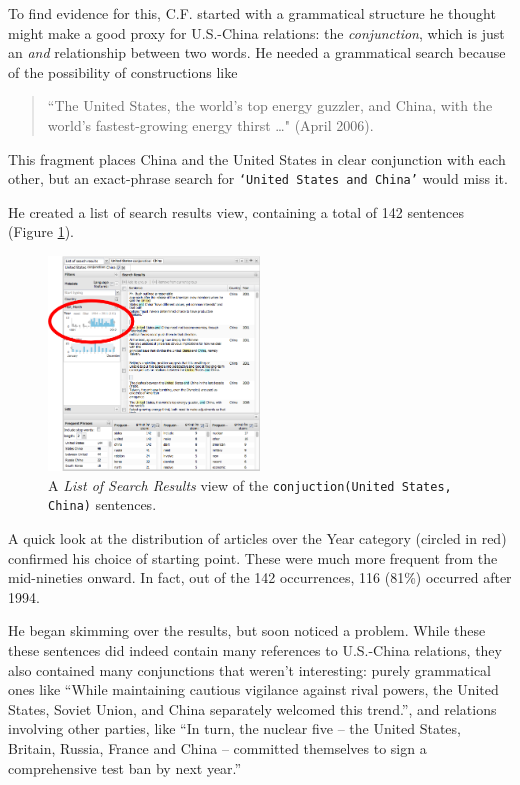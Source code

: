 \documentclass{sig-alternate}
\newcommand{\code}[1] {\texttt{#1}}
\begin{document}
\begin{enumerate}
To find evidence for this, C.F.  started with a grammatical structure he thought might make a good proxy for U.S.-China relations: the \emph{conjunction}, which is just an \emph{and} relationship between two words.  He needed a grammatical search because of the possibility of constructions like 
\begin{quote}
``The United States, the world's top energy guzzler, and China, with the world's fastest-growing energy thirst \ldots" (April 2006).
\end{quote}
This fragment places China and the United States in clear conjunction with each other, but an exact-phrase search for \code{`United States and China'} would miss it. 

He created a list of search results view, containing a total of 142 sentences (Figure \ref{fig:chris05}).
\begin{figure}[h!]
\includegraphics[width=0.5\textwidth]{fig/chris/05-circled.png}
\caption{ A \emph{List of Search Results} view of the \code{conjuction(United States, China)} sentences. \label{fig:chris05}}
\end{figure}
A quick look at the distribution of articles over the Year category (circled in red) confirmed his choice of starting point. These were much more frequent from the mid-nineties onward. In fact, out of the 142 occurrences, 116 (81\%) occurred after 1994.

He began skimming over the results, but soon noticed a problem. While these these sentences did indeed contain many references to U.S.-China relations, they also contained many conjunctions that weren't interesting: purely grammatical ones like ``While maintaining cautious vigilance against rival powers, the United States, Soviet Union, and China separately welcomed this trend.'', and relations involving other parties, like ``In turn, the nuclear five -- the United States, Britain, Russia, France and China -- committed themselves to sign a comprehensive test ban by next year.''


\end{enumerate}
\end{document}
